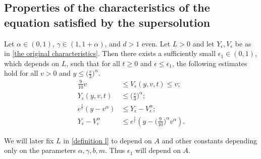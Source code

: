 \documentclass[11pt]{article}
\numberwithin{equation}{section}
\begin{document}
\subsection{Properties of the characteristics of the equation satisfied by the supersolution}
   \begin{prop}\label{proposition about inequalities}
Let $\alpha\in(0,1)$, $\gamma\in(1,1+\alpha)$, and $d>1$ even. Let $L>0$ and let $Y_{\epsilon}, V_{\epsilon}$ be as in \eqref{the original characteristics}. Then there exists a sufficiently small $\epsilon_{1}\in(0,1)$, which depends on $L$, such that for all $t \geq 0$ and $\epsilon\leq \epsilon_{1}$, the following estimates hold for all $v>0$ and $y\leq \big(\frac{v}{3}\big)^{\alpha}$.
      \begin{align}
        \frac{9}{10} v &\leq  V_{\epsilon}(y,v,t)\leq v;\label{ineq}\\
     Y_{\epsilon}(y,v,t)&\leq \big(\frac{v}{3}\big)^{\alpha};\label{ineq part two}\\
e^{\frac{t}{\epsilon}} (y-v^{\alpha}) & \leq   Y_{\epsilon}-V_{\epsilon}^{\alpha};\label{ineqq}\\
 Y_{\epsilon}-V_{\epsilon}^{\alpha}&\leq e^{\frac{t}{\epsilon}} (y-\Big(\frac{9}{10}\Big)^{\alpha}v^{\alpha}).\label{ineq 3}
      \end{align}
  \end{prop}
  \begin{rmk}
      We will later fix $L$ in \eqref{definition l} to depend on $A$ and other constants depending only on the parameters $\alpha,\gamma,b,m$. Thus $\epsilon_{1}$ will depend on $A$.
  \end{rmk}
\end{document}
